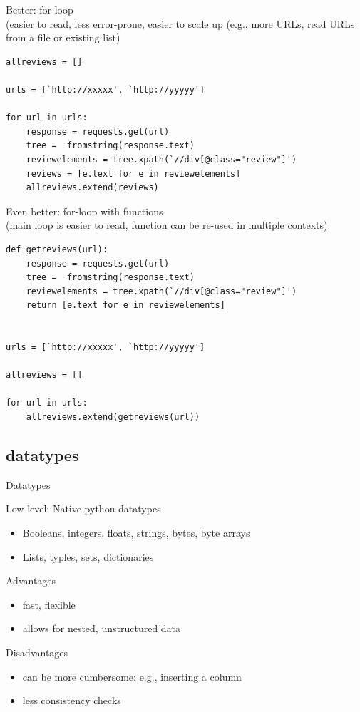 \documentclass{beamer}
\begin{document}
\begin{frame}
Better: for-loop\\ (easier to read, less error-prone, easier to scale up (e.g., more URLs, read URLs from a file or existing list)
\begin{lstlisting}
allreviews = []

urls = [`http://xxxxx', `http://yyyyy']

for url in urls:
    response = requests.get(url)
    tree =  fromstring(response.text)
    reviewelements = tree.xpath(`//div[@class="review"]')
    reviews = [e.text for e in reviewelements]
    allreviews.extend(reviews)
\end{lstlisting}
\end{frame}


\begin{frame}
Even better: for-loop with functions\\ (main loop is easier to read, function can be re-used in multiple contexts)
\begin{lstlisting}
def getreviews(url):
    response = requests.get(url)
    tree =  fromstring(response.text)
    reviewelements = tree.xpath(`//div[@class="review"]')
    return [e.text for e in reviewelements]


urls = [`http://xxxxx', `http://yyyyy']

allreviews = []

for url in urls:
    allreviews.extend(getreviews(url))
\end{lstlisting}
\end{frame}

\subsection{datatypes}
\begin{frame}{Datatypes}
\begin{block}{Low-level: Native python datatypes}
	\begin{itemize}[<+->]
		\item Booleans, integers, floats, strings, bytes, byte arrays
		\item Lists, typles, sets, dictionaries
	\end{itemize}
\end{block}
\pause
\begin{exampleblock}{Advantages }
	\begin{itemize}[<+->]
		\item fast, flexible
		\item allows for nested, unstructured data 
	\end{itemize}
\end{exampleblock}
\pause
\begin{alertblock}{Disadvantages }
	\begin{itemize}[<+->]
		\item can be more cumbersome: e.g., inserting a column
		\item less consistency checks
	\end{itemize}
\end{alertblock}
\end{frame}
\end{document}
